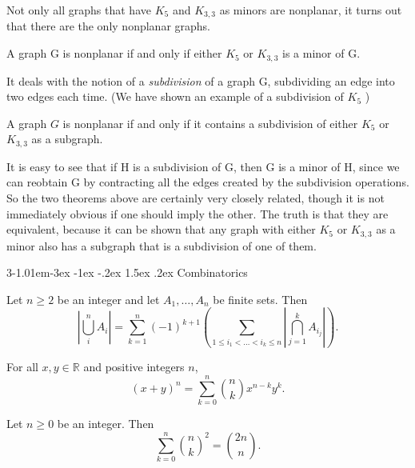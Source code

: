 \documentclass{tufte-handout}
\makeatletter
\renewcommand{\section}{\@startsection{section}%
    {3}{-1.01em}{-3ex \@plus -1ex \@minus -.2ex}%
    {1.5ex \@plus .2ex}
    {\hspace*{-5.5em}\fcolorbox{blue}{blue}{\parbox[c][1.0ex][b]{4em}{\phantom{space}}}
    \normalfont\Large\itshape\color{blue}}}
\makeatother
\begin{document}
Not only all graphs that have \( K_5 \) and \( K_{3,3} \) as minors are nonplanar, it turns out that
there are the only nonplanar graphs.

\begin{Theorem}
    A graph G is nonplanar if and only if either \(K_5\) or \(K_{3,3}\) is a minor of G.
\end{Theorem}

It deals with the notion of a \textit{subdivision} of a graph G, subdividing an edge into two edges each time. 
(We have shown an example of a subdivision of \( K_5 \) )

\begin{Theorem}
    A graph \(G\) is nonplanar if and only if it contains a subdivision of either \(K_5\) or \(K_{3,3}\) as a subgraph.
\end{Theorem}

It is easy to see that if H is a subdivision of G, then G is a minor of H,
since we can reobtain G by contracting all the edges created by the subdivision
operations. So the two theorems above are certainly very closely related, though
it is not immediately obvious if one should imply the other. The truth is that
they are equivalent, because it can be shown that any graph with either \( K_5 \) or
\( K_{3,3} \) as a minor also has a subgraph that is a subdivision of one of them.

\section{Combinatorics}
\begin{Theorem}
    Let \( n\geq 2 \) be an integer and let \( A_1, \ldots , A_n \)
    be finite sets. Then
    \[\left|\bigcup_{i}^{n}A_i\right| =\sum_{k=1}^{n}(-1)^{k+1}\left(\sum_{1\leq i_1 < \ldots < i_k \leq n}\left|\bigcap_{j=1}^{k}A_{i_j}\right|\right).\]
\end{Theorem}

\begin{Theorem}
    For all \( x,y\in \mathbb{R} \) and positive integers \( n \),
    \[(x+y)^n = \sum_{k=0}^{n}\binom{n}{k}x^{n-k}y^k.\]
\end{Theorem}

\begin{Proposition}
    Let \( n \geq 0 \) be an integer. Then
    \[ \sum_{k=0}^{n}\binom{n}{k}^2 = \binom{2n}{n}.\]
\end{Proposition}
\end{document}
